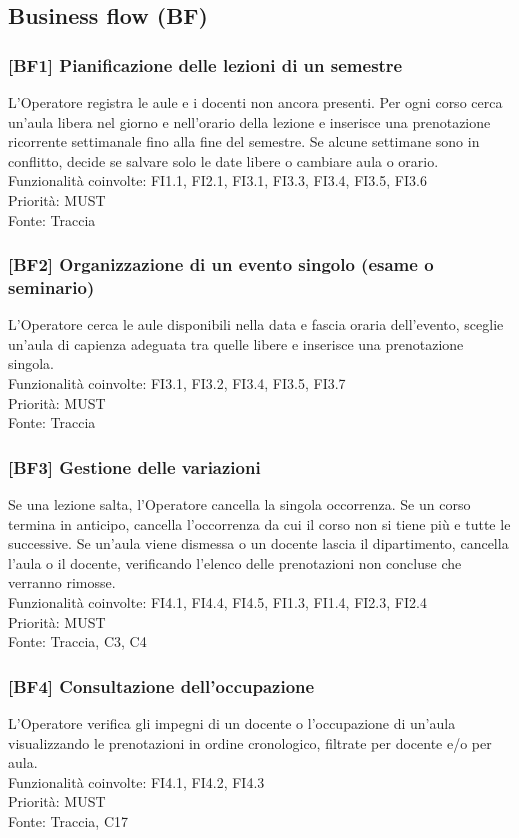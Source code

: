 \subsection{Business flow (BF)}
\subsubsection{[BF1] Pianificazione delle lezioni di un semestre}
L'Operatore registra le aule e i docenti non ancora presenti. Per ogni corso cerca un'aula libera nel giorno e nell'orario della lezione e inserisce una prenotazione ricorrente settimanale fino alla fine del semestre. Se alcune settimane sono in conflitto, decide se salvare solo le date libere o cambiare aula o orario.\\
Funzionalità coinvolte: FI1.1, FI2.1, FI3.1, FI3.3, FI3.4, FI3.5, FI3.6\\Priorità: MUST\\Fonte: Traccia

\subsubsection{[BF2] Organizzazione di un evento singolo (esame o seminario)}
L'Operatore cerca le aule disponibili nella data e fascia oraria dell'evento, sceglie un'aula di capienza adeguata tra quelle libere e inserisce una prenotazione singola.\\
Funzionalità coinvolte: FI3.1, FI3.2, FI3.4, FI3.5, FI3.7\\Priorità: MUST\\Fonte: Traccia

\subsubsection{[BF3] Gestione delle variazioni}
Se una lezione salta, l'Operatore cancella la singola occorrenza. Se un corso termina in anticipo, cancella l'occorrenza da cui il corso non si tiene più e tutte le successive. Se un'aula viene dismessa o un docente lascia il dipartimento, cancella l'aula o il docente, verificando l'elenco delle prenotazioni non concluse che verranno rimosse.\\
Funzionalità coinvolte: FI4.1, FI4.4, FI4.5, FI1.3, FI1.4, FI2.3, FI2.4\\Priorità: MUST\\Fonte: Traccia, C3, C4

\subsubsection{[BF4] Consultazione dell'occupazione}
L'Operatore verifica gli impegni di un docente o l'occupazione di un'aula visualizzando le prenotazioni in ordine cronologico, filtrate per docente e/o per aula.\\
Funzionalità coinvolte: FI4.1, FI4.2, FI4.3\\Priorità: MUST\\Fonte: Traccia, C17
